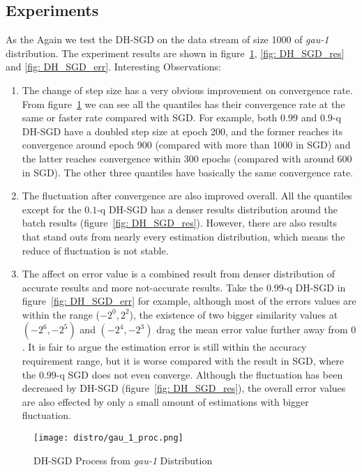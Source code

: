 \subsection{Experiments}
\graphicspath{{Figures/Stepsize_adapt/Adaptive_stepsize/}{./}} 
\label{subsec: DB_SGD_exp}
As the 
Again we test the DH-SGD on the data stream of size 1000 of \textit{gau-1} distribution. The experiment results are shown in figure~\ref{fig: DH_SGD_proc}, \ref{fig: DH_SGD_res} and \ref{fig: DH_SGD_err}.
Interesting Observations:
\begin{enumerate}
    \item The change of step size has a very obvious improvement on convergence rate. From figure~\ref{fig: DH_SGD_proc}  we can see all the quantiles has their convergence rate at the same or faster rate compared with SGD. For example, both $0.99$ and $0.9$-q DH-SGD have a doubled step size at epoch 200, and the former reaches its convergence around epoch 900 (compared with more than 1000 in SGD) and the latter reaches convergence within 300 epochs (compared with around 600 in SGD). The other three quantiles have basically the same convergence rate.
    
    \item The fluctuation after convergence are also improved overall. All the quantiles except for the $0.1$-q DH-SGD has a denser results distribution around the batch results (figure~\ref{fig: DH_SGD_res}). However, there are also results that stand outs from nearly every estimation distribution, which means the reduce of fluctuation is not stable.
    
    \item The affect on error value is a combined result from denser distribution of accurate results and more not-accurate results. Take the $0.99$-q DH-SGD in figure~\ref{fig: DH_SGD_err} for example, although most of the errors values are within the range ($-2^0, 2^2$), the existence of two bigger similarity values at $(-2^6, -2^5)$ and $(-2^4, -2^3)$ drag the mean error value further away from $0$. It is fair to argue the estimation error is still within the accuracy requirement range, but it is worse compared with the result in SGD, where the $0.99$-q SGD does not even converge. Although the fluctuation has been decreased by DH-SGD (figure~\ref{fig: DH_SGD_res}), the overall error values are also effected by only a small amount of estimations with bigger fluctuation. 
\end{enumerate}

\begin{figure}[H]
    \centering
	\texttt{[image: distro/gau\_1\_proc.png]}
    \caption{DH-SGD Process from \textit{gau-1} Distribution}
    \label{fig: DH_SGD_proc}
\end{figure}


